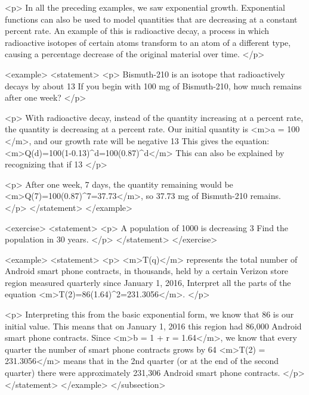         <p>
            In all the preceding examples, we saw exponential growth.
            Exponential functions can also be used to model quantities that are decreasing at a constant percent rate.
            An example of this is radioactive decay, a process in which radioactive isotopes of certain atoms transform to an atom of a different type, causing a percentage decrease of the original material over time.
        </p>

        <example>
            <statement>
                <p>
                    Bismuth-210 is an isotope that radioactively decays by about 13%
                    If you begin with 100 mg of Bismuth-210, how much remains after one week?
                </p>

                <p>
                    With radioactive decay, instead of the quantity increasing at a percent rate, the quantity is decreasing at a percent rate.
                    Our initial quantity is <m>a = 100 </m>, and our growth rate will be negative 13%
                    This gives the equation: <m>Q(d)=100(1-0.13)^{d}=100(0.87)^{d}</m> This can also be explained by recognizing that if 13%
                </p>

                <p>
                    After one week, 7 days, the quantity remaining would be <m>Q(7)=100(0.87)^{7}=37.73</m>, so 37.73 mg of Bismuth-210 remains.
                </p>
            </statement>
        </example>

        <exercise>
            <statement>
                <p>
                    A population of 1000 is decreasing 3%
                    Find the population in 30 years.
                </p>
            </statement>
        </exercise>

        <example>
            <statement>
                <p>
                    <m>T(q)</m> represents the total number of Android smart phone contracts, in thousands, held by a certain Verizon store region measured quarterly since January 1, 2016, Interpret all the parts of the equation <m>T(2)=86(1.64)^{2}=231.3056</m>.
                </p>

                <p>
                    Interpreting this from the basic exponential form, we know that 86 is our initial value.
                    This means that on January 1, 2016 this region had 86,000 Android smart phone contracts.
                    Since <m>b = 1 + r = 1.64</m>, we know that every quarter the number of smart phone contracts grows by 64%
                    <m>T(2) = 231.3056</m> means that in the 2nd quarter (or at the end of the second quarter) there were approximately 231,306 Android smart phone contracts.
                </p>
            </statement>
        </example>
    </subsection>


